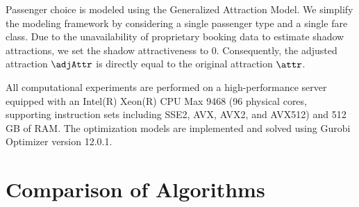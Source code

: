 Passenger choice is modeled using the Generalized Attraction Model. We simplify the modeling framework by considering a single passenger type and a single fare class. Due to the unavailability of proprietary booking data to estimate shadow attractions, we set the shadow attractiveness to 0. Consequently, the adjusted attraction $\adjAttr$ is directly equal to the original attraction $\attr$.

All computational experiments are performed on a high-performance server equipped with an Intel(R) Xeon(R) CPU Max 9468 (96 physical cores, supporting instruction sets including SSE2, AVX, AVX2, and AVX512) and 512 GB of RAM. The optimization models are implemented and solved using Gurobi Optimizer version 12.0.1.

\section{Comparison of Algorithms}\label{sec:computational_study.comparison}
